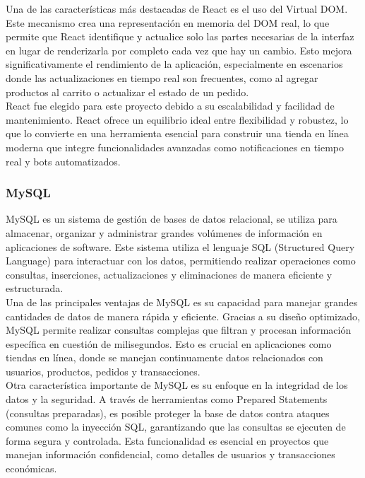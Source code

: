 \documentclass[a4paper,12pt]{article}
\begin{document}
Una de las características más destacadas de React es el uso del Virtual DOM. Este mecanismo crea una representación en memoria del DOM real, lo que permite que React identifique y actualice solo las partes necesarias de la interfaz en lugar de renderizarla por completo cada vez que hay un cambio. Esto mejora significativamente el rendimiento de la aplicación, especialmente en escenarios donde las actualizaciones en tiempo real son frecuentes, como al agregar productos al carrito o actualizar el estado de un pedido.\\

React fue elegido para este proyecto debido a su escalabilidad y facilidad de mantenimiento. React ofrece un equilibrio ideal entre flexibilidad y robustez, lo que lo convierte en una herramienta esencial para construir una tienda en línea moderna que integre funcionalidades avanzadas como notificaciones en tiempo real y bots automatizados.
\newpage
\subsubsection{MySQL}

MySQL es un sistema de gestión de bases de datos relacional, se utiliza para almacenar, organizar y administrar grandes volúmenes de información en aplicaciones de software. Este sistema utiliza el lenguaje SQL (Structured Query Language) para interactuar con los datos, permitiendo realizar operaciones como consultas, inserciones, actualizaciones y eliminaciones de manera eficiente y estructurada. \\

Una de las principales ventajas de MySQL es su capacidad para manejar grandes cantidades de datos de manera rápida y eficiente. Gracias a su diseño optimizado, MySQL permite realizar consultas complejas que filtran y procesan información específica en cuestión de milisegundos. Esto es crucial en aplicaciones como tiendas en línea, donde se manejan continuamente datos relacionados con usuarios, productos, pedidos y transacciones.\\

Otra característica importante de MySQL es su enfoque en la integridad de los datos y la seguridad. A través de herramientas como Prepared Statements (consultas preparadas), es posible proteger la base de datos contra ataques comunes como la inyección SQL, garantizando que las consultas se ejecuten de forma segura y controlada. Esta funcionalidad es esencial en proyectos que manejan información confidencial, como detalles de usuarios y transacciones económicas.\\
\end{document}

